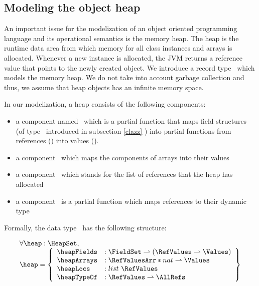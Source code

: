 

 \subsection{Modeling the object heap} \label{heap}
 An important issue for the modelization of an object oriented programming language and its operational semantics
 is the memory heap. The heap is the
 runtime data area from which memory  for all class instances and arrays is allocated. Whenever a new instance
 is allocated, the JVM returns a reference value that points to the newly created object. 
 We introduce a record type \HeapSet \ which models the memory heap. We do not take into account 
 garbage collection and thus, we assume that heap objects has an infinite memory space. 
 
 In our modelization, a heap consists of the following components:
 \begin{itemize}
       \item a component  named \heapFields \ which is a partial function that maps field
             structures (of type \FieldSet \ introduced in subsection \ref{clazz} ) into partial functions from references (\AllRefs)
	     into values (\Values).  
 

       \item  a component \heapArrays \ which maps the components of arrays  into their values

       \item  a component  \heapLocs  \ which stands for the  list of references that the heap has allocated  
              
       \item  a component \heapTypeOf   \ is a partial function  which maps references to their dynamic type 
 \end{itemize}


 Formally, the data type \HeapSet \ has the following structure:



  $$ \begin{array}{l}
         \forall  \heap : \HeapSet , \\
         \heap = \left\{\begin{array}{ll}  \heapFields  &  : \FieldSet \rightharpoonup (  \RefValues \rightharpoonup \Values) \\
                                           \heapArrays  &  : \RefValuesArr * nat \rightharpoonup \Values \\
					   \heapLocs    &  : list \ \RefValues \\
					   \heapTypeOf  &  : \RefValues \rightharpoonup \AllRefs
                    \end{array} \right\}
   \end{array} $$


